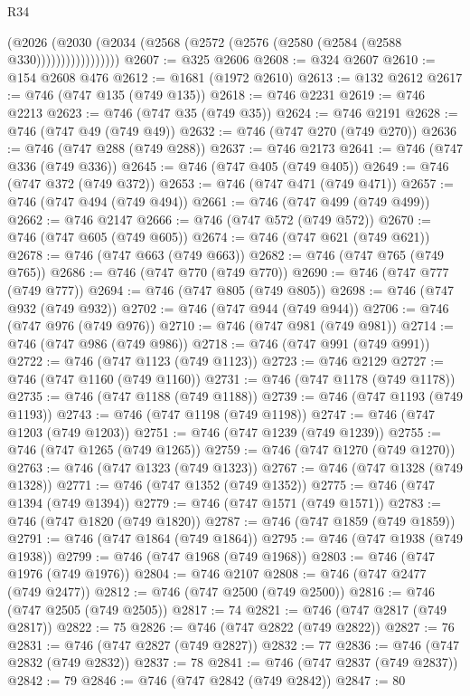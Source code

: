 \begin{lexlean}{R34}
\begin{coremodule}
                    (@2026
                      (@2030 (@2034 (@2568 (@2572 (@2576 (@2580 (@2584 (@2588 @330)))))))))))))))))
@2607 := @325 @2606
@2608 := @324 @2607
@2610 := @154 @2608 @476
@2612 := @1681 (@1972 @2610)
@2613 := @132 @2612
@2617 := @746 (@747 @135 (@749 @135))
@2618 := @746 @2231
@2619 := @746 @2213
@2623 := @746 (@747 @35 (@749 @35))
@2624 := @746 @2191
@2628 := @746 (@747 @49 (@749 @49))
@2632 := @746 (@747 @270 (@749 @270))
@2636 := @746 (@747 @288 (@749 @288))
@2637 := @746 @2173
@2641 := @746 (@747 @336 (@749 @336))
@2645 := @746 (@747 @405 (@749 @405))
@2649 := @746 (@747 @372 (@749 @372))
@2653 := @746 (@747 @471 (@749 @471))
@2657 := @746 (@747 @494 (@749 @494))
@2661 := @746 (@747 @499 (@749 @499))
@2662 := @746 @2147
@2666 := @746 (@747 @572 (@749 @572))
@2670 := @746 (@747 @605 (@749 @605))
@2674 := @746 (@747 @621 (@749 @621))
@2678 := @746 (@747 @663 (@749 @663))
@2682 := @746 (@747 @765 (@749 @765))
@2686 := @746 (@747 @770 (@749 @770))
@2690 := @746 (@747 @777 (@749 @777))
@2694 := @746 (@747 @805 (@749 @805))
@2698 := @746 (@747 @932 (@749 @932))
@2702 := @746 (@747 @944 (@749 @944))
@2706 := @746 (@747 @976 (@749 @976))
@2710 := @746 (@747 @981 (@749 @981))
@2714 := @746 (@747 @986 (@749 @986))
@2718 := @746 (@747 @991 (@749 @991))
@2722 := @746 (@747 @1123 (@749 @1123))
@2723 := @746 @2129
@2727 := @746 (@747 @1160 (@749 @1160))
@2731 := @746 (@747 @1178 (@749 @1178))
@2735 := @746 (@747 @1188 (@749 @1188))
@2739 := @746 (@747 @1193 (@749 @1193))
@2743 := @746 (@747 @1198 (@749 @1198))
@2747 := @746 (@747 @1203 (@749 @1203))
@2751 := @746 (@747 @1239 (@749 @1239))
@2755 := @746 (@747 @1265 (@749 @1265))
@2759 := @746 (@747 @1270 (@749 @1270))
@2763 := @746 (@747 @1323 (@749 @1323))
@2767 := @746 (@747 @1328 (@749 @1328))
@2771 := @746 (@747 @1352 (@749 @1352))
@2775 := @746 (@747 @1394 (@749 @1394))
@2779 := @746 (@747 @1571 (@749 @1571))
@2783 := @746 (@747 @1820 (@749 @1820))
@2787 := @746 (@747 @1859 (@749 @1859))
@2791 := @746 (@747 @1864 (@749 @1864))
@2795 := @746 (@747 @1938 (@749 @1938))
@2799 := @746 (@747 @1968 (@749 @1968))
@2803 := @746 (@747 @1976 (@749 @1976))
@2804 := @746 @2107
@2808 := @746 (@747 @2477 (@749 @2477))
@2812 := @746 (@747 @2500 (@749 @2500))
@2816 := @746 (@747 @2505 (@749 @2505))
@2817 := 74
@2821 := @746 (@747 @2817 (@749 @2817))
@2822 := 75
@2826 := @746 (@747 @2822 (@749 @2822))
@2827 := 76
@2831 := @746 (@747 @2827 (@749 @2827))
@2832 := 77
@2836 := @746 (@747 @2832 (@749 @2832))
@2837 := 78
@2841 := @746 (@747 @2837 (@749 @2837))
@2842 := 79
@2846 := @746 (@747 @2842 (@749 @2842))
@2847 := 80

\end{coremodule}
\end{lexlean}
